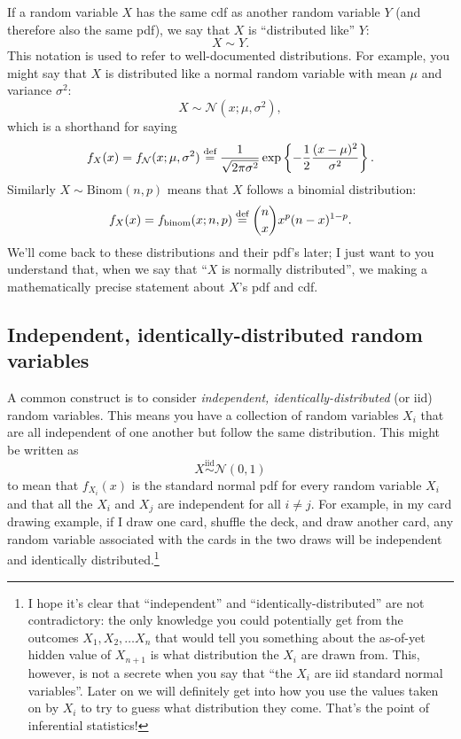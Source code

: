If a random variable $X$ has the same cdf as another random variable $Y$ (and
therefore also the same pdf), we say that $X$ is ``distributed like'' $Y$:
$$
X \sim Y.
$$
This notation is used to refer to well-documented distributions. For example,
you might say that $X$ is distributed like a normal random variable with mean
$\mu$ and variance $\sigma^2$:
$$
X \sim \mathcal{N}(x; \mu, \sigma^2),
$$
which is a shorthand for saying
\begin{equation*}
f_X(x) = f_\mathcal{N}(x; \mu, \sigma^2) \stackrel{\text{def}}{=}
  \frac{1}{\sqrt{2\pi\sigma^2}} \exp \left\{-\frac{1}{2} \frac{(x-\mu)^2}{\sigma^2} \right\}.
\end{equation*}
Similarly $X \sim \mathrm{Binom}(n, p)$ means that $X$ follows a binomial distribution:
\begin{equation*}
f_X(x) = f_\mathrm{binom}(x; n, p) \stackrel{\text{def}}{=} \binom{n}{x} x^p (n-x)^{1-p}.
\end{equation*}
We'll come back to these distributions and their pdf's later; I just want to
you understand that, when we say that ``$X$ is normally distributed'', we
making a mathematically precise statement about $X$'s pdf and cdf.

\subsection{Independent, identically-distributed random variables}

A common construct is to consider \emph{independent, identically-distributed}
(or iid) random variables. This means you have a collection of random variables $X_i$
that are all independent of one another but follow the same distribution. This
might be written as
\begin{equation*}
X \stackrel{\text{iid}}{\sim} \mathcal{N}(0, 1)
\end{equation*}
to mean that $f_{X_i}(x)$ is the standard normal pdf for every random variable
$X_i$ and that all the $X_i$ and $X_j$ are independent for all $i \neq j$.
For example, in my card drawing example, if I draw one card, shuffle the deck,
and draw another card, any random variable associated with the cards in the
two draws will be independent and identically distributed.\footnote{I hope
it's clear that ``independent'' and ``identically-distributed'' are not
contradictory: the only knowledge you could potentially get from the outcomes
$X_1, X_2, \ldots X_n$ that would tell you something about the as-of-yet
hidden value of $X_{n+1}$ is what distribution the $X_i$ are drawn from. This,
however, is not a secrete when you say that ``the $X_i$ are iid standard
normal variables''. Later on we will definitely get into how you use the
values taken on by $X_i$ to try to guess what distribution they come. That's
the point of inferential statistics!}


